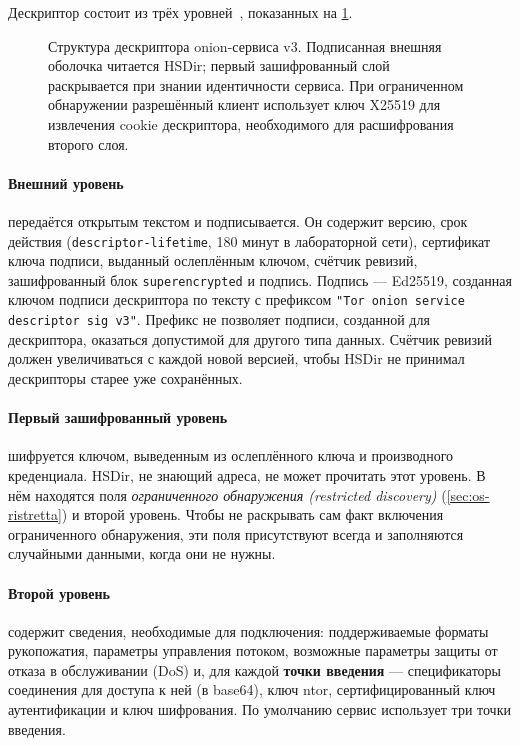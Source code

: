 Дескриптор состоит из трёх уровней~, показанных на \cref{fig:os-descrittore}.

\begin{figure}[htbp]
\centering

\caption{Структура дескриптора onion-сервиса v3. Подписанная внешняя оболочка читается HSDir; первый зашифрованный слой раскрывается при знании идентичности сервиса. При ограниченном обнаружении разрешённый клиент использует ключ X25519 для извлечения cookie дескриптора, необходимого для расшифрования второго слоя.}
\label{fig:os-descrittore}
\end{figure}

\paragraph{Внешний уровень} передаётся открытым текстом и подписывается. Он содержит версию, срок действия (\texttt{descriptor-lifetime}, 180 минут в лабораторной сети), сертификат ключа подписи, выданный ослеплённым ключом, счётчик ревизий, зашифрованный блок \texttt{superencrypted} и подпись. Подпись — Ed25519, созданная ключом подписи дескриптора по тексту с префиксом \texttt{"Tor onion service descriptor sig v3"}. Префикс не позволяет подписи, созданной для дескриптора, оказаться допустимой для другого типа данных. Счётчик ревизий должен увеличиваться с каждой новой версией, чтобы HSDir не принимал дескрипторы старее уже сохранённых.

\paragraph{Первый зашифрованный уровень} шифруется ключом, выведенным из ослеплённого ключа и производного креденциала. HSDir, не знающий адреса, не может прочитать этот уровень. В нём находятся поля \emph{ограниченного обнаружения (restricted discovery)} (\cref{sec:os-ristretta}) и второй уровень. Чтобы не раскрывать сам факт включения ограниченного обнаружения, эти поля присутствуют всегда и заполняются случайными данными, когда они не нужны.

\paragraph{Второй уровень} содержит сведения, необходимые для подключения: поддерживаемые форматы рукопожатия, параметры управления потоком, возможные параметры защиты от отказа в обслуживании (DoS) и, для каждой \textbf{точки введения} --- спецификаторы соединения для доступа к ней (в base64), ключ ntor, сертифицированный ключ аутентификации и ключ шифрования. По умолчанию сервис использует три точки введения.

